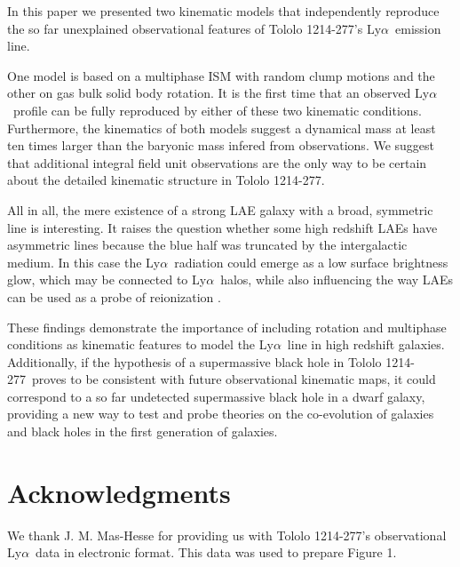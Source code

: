\documentclass[a4,useAMS,usenatbib,usegraphicx]{mn2e}
\newcommand{\tol}{Tololo 1214-277}
\newcommand{\lya}{Ly$\alpha$}
\begin{document}
In this paper we presented two kinematic models that independently
reproduce the so far unexplained observational features of \tol's
\lya\ emission line.  

One model is based on a multiphase ISM with random clump motions and
the other on gas bulk solid body rotation.
It is the first time that an observed \lya\ profile can be fully
reproduced by either of these two kinematic conditions.
Furthermore, the kinematics of both models suggest a dynamical mass
at least ten times larger than the baryonic mass infered from observations.
We suggest that additional integral field unit observations are the
only way to be certain about the detailed kinematic structure in \tol.

All in all, the mere existence of a strong LAE galaxy with a broad,
symmetric line is interesting.
It raises the question whether some high redshift LAEs have asymmetric
lines because the blue half was truncated by the intergalactic medium.
In this case the \lya\ radiation could emerge as a low surface
brightness glow, which may be connected to \lya\ halos, while also
influencing the way LAEs can be used as a probe of reionization
\citep{2014PASA...31...40D}.  

These findings demonstrate the importance of including rotation and multiphase
conditions as kinematic features to model the \lya\ line in high redshift
galaxies.
Additionally, if the hypothesis of a supermassive black
hole in \tol\ proves to be consistent with future observational
kinematic maps, it could correspond to a so far undetected
supermassive black hole in a dwarf galaxy, providing a new way to test
and probe theories on the co-evolution of galaxies and black holes in
the first generation of galaxies.   



\section*{Acknowledgments}
We thank J. M. Mas-Hesse for providing us with \tol's observational
\lya\ data \citep{mashesse03} in electronic format. This data was
used to prepare Figure 1.





\end{document}
